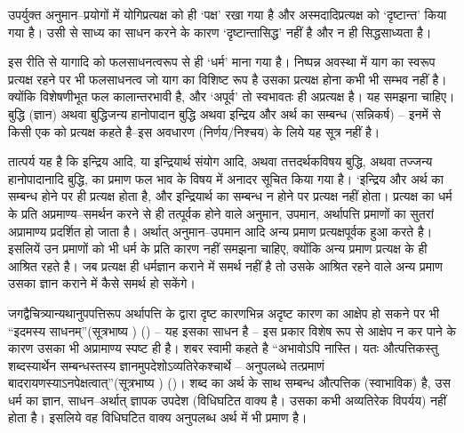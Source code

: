 उपर्युक्त अनुमान–प्रयोगों में योगिप्रत्यक्ष को ही ‘पक्ष' रखा गया है और अस्मदादिप्रत्यक्ष को ‘दृष्टान्त' किया गया है। उसी से साध्य का साधन करने के कारण ‘दृष्टान्तासिद्ध' नहीं है और न ही सिद्धसाध्यता है।

इस रीति से यागादि को फलसाधनत्वरूप से ही ‘धर्म' माना गया है। निष्पन्न अवस्था में याग का स्वरूप प्रत्यक्ष रहने पर भी फलसाधनत्व जो याग का विशिष्ट रूप है उसका प्रत्यक्ष होना कभी भी सम्भव नहीं है। क्योंकि विशेषणीभूत फल कालान्तरभावी है, और ‘अपूर्व' तो स्वभावतः ही अप्रत्यक्ष है। यह समझना चाहिए। बुद्धि (ज्ञान) अथवा बुद्धिजन्य हानोपादान बुद्धि अथवा इन्द्रिय और अर्थ का सम्बन्ध (सन्निकर्ष) – इनमें से किसी एक को प्रत्यक्ष कहते है–इस अवधारण (निर्णय/निश्चय) के लिये यह सूत्र नहीं है। 

तात्पर्य यह है कि इन्द्रिय आदि, या इन्द्रियार्थ संयोग आदि, अथवा तत्तदर्थकविषय बुद्धि, अथवा तज्जन्य हानोपादानादि बुद्धि, का प्रमाण फल भाव के विषय में अनादर सूचित किया गया है। ‘इन्द्रिय और अर्थ का सम्बन्ध होने पर ही प्रत्यक्ष होता है, और इन्द्रियार्थ का सम्बन्ध न होने पर प्रत्यक्ष नहीं होता। प्रत्यक्ष का धर्म के प्रति अप्रमाण्य–समर्थन करने से ही तत्पूर्वक होने वाले अनुमान, उपमान, अर्थापत्ति प्रमाणों का सुतरां अप्रामाण्य प्रदर्शित हो जाता है। अर्थात् अनुमान–उपमान आदि अन्य प्रमाण प्रत्यक्षपूर्वक हुआ करते है। इसलियें उन प्रमाणों को भी धर्म के प्रति कारण नहीं समझना चाहिए, क्योंकि अन्य प्रमाण प्रत्यक्ष के ही आश्रित रहते है। जब प्रत्यक्ष ही धर्मज्ञान कराने में समर्थ नहीं है तो उसके आश्रित रहने वाले अन्य प्रमाण उसका ज्ञान कराने में कैसे समर्थ हो सकेंगे। 

जगद्वैचित्र्यान्यथानुपपत्तिरूप अर्थापत्ति के द्वारा दृष्ट कारणभिन्न अदृष्ट कारण का आक्षेप हो सकने पर भी “इदमस्य साधनम्”(सूत्रभाष्य ) () – यह इसका साधन है – इस प्रकार विशेष रूप से आक्षेप न कर पाने के कारण उसका भी अप्रामाण्य स्पष्ट ही है। शबर स्वामी कहते है “अभावोऽपि नास्ति। यतः औत्पत्तिकस्तु शब्दस्यार्थेन सम्बन्धस्तस्य ज्ञानमुपदेशोऽव्यतिरेकश्चार्थे – अनुपलब्धे तत्प्रमाणं बादरायणस्याऽनपेक्षत्वात्”(सूत्रभाष्य ) ()। शब्द का अर्थ के साथ सम्बन्ध औत्पत्तिक (स्वाभाविक) है, उस धर्म का ज्ञान, साधन–अर्थात् ज्ञापक उपदेश (विधिघटित वाक्य है। उसका कभी अव्यतिरेक विपर्यय) नहीं होता है। इसलिये वह विधिघटित वाक्य अनुपलब्ध अर्थ में भी प्रमाण है।

